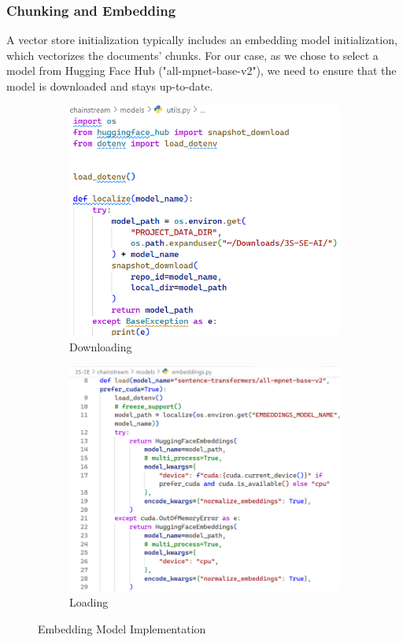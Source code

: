 \subsubsection{Chunking and Embedding}
A vector store initialization typically includes an embedding model initialization, which vectorizes the documents' chunks. For our case, as we chose to select a model from Hugging Face Hub ("all-mpnet-base-v2"), we need to ensure that the model is downloaded and stays up-to-date.
\begin{figure}[htbp]
    \centering
    \begin{subfigure}{0.45\textwidth}
        \centering
        \includegraphics[width=\linewidth]{./figures/embedding-model-downloading.png}
        \caption{Downloading}
    \end{subfigure}
    \hfill
    \begin{subfigure}{0.45\textwidth}
        \centering
        \includegraphics[width=\linewidth]{./figures/embedding-model-loading.png}
        \caption{Loading}
    \end{subfigure}
    \caption{Embedding Model Implementation}
\end{figure}\newline
